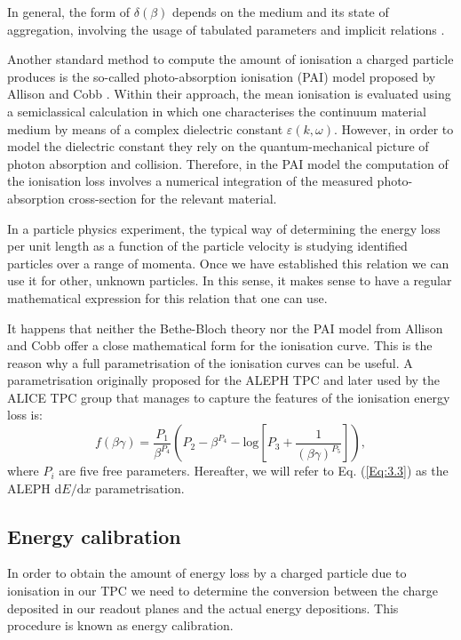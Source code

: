 In general, the form of $\delta(\beta)$ depends on the medium and its state of aggregation, involving the usage of tabulated parameters and implicit relations \cite{Sternheimer1984}.

Another standard method to compute the amount of ionisation a charged particle produces is the so-called photo-absorption ionisation (PAI) model proposed by Allison and Cobb \cite{Allison1980}. Within their approach, the mean ionisation is evaluated using a semiclassical calculation in which one characterises the continuum material medium by means of a complex dielectric constant $\varepsilon(k, \omega)$. However, in order to model the dielectric constant they rely on the quantum-mechanical picture of photon absorption and collision. Therefore, in the PAI model the computation of the ionisation loss involves a numerical integration of the measured photo-absorption cross-section for the relevant material.

In a particle physics experiment, the typical way of determining the energy loss per unit length as a function of the particle velocity is studying identified particles over a range of momenta. Once we have established this relation we can use it for other, unknown particles. In this sense, it makes sense to have a regular mathematical expression for this relation that one can use.

It happens that neither the Bethe-Bloch theory nor the PAI model from Allison and Cobb offer a close mathematical form for the ionisation curve. This is the reason why a full parametrisation of the ionisation curves can be useful. A parametrisation originally proposed for the ALEPH TPC \cite{Blum2008} and later used by the ALICE TPC \cite{ALICETPC2013} group that manages to capture the features of the ionisation energy loss is:
\begin{equation}\label{Eq:3.3}
    f(\beta\gamma) = \frac{P_{1}}{\beta^{P_{4}}}\left(P_{2}-\beta^{P_{4}}-\mathrm{log}\left[P_{3}+\frac{1}{(\beta\gamma)^{P_{5}}}\right]\right),
\end{equation}
where $P_{i}$ are five free parameters. Hereafter, we will refer to Eq. (\ref{Eq:3.3}) as the ALEPH $\mathrm{d}E/\mathrm{d}x$ parametrisation.

\subsection{Energy calibration}

In order to obtain the amount of energy loss by a charged particle due to ionisation in our TPC we need to determine the conversion between the charge deposited in our readout planes and the actual energy depositions. This procedure is known as energy calibration.

